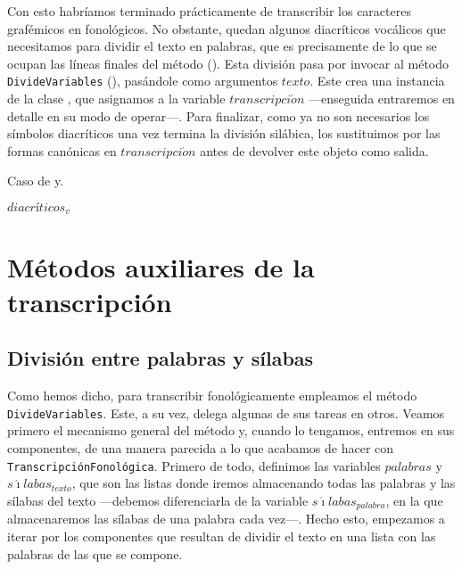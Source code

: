 Con esto habríamos terminado prácticamente de transcribir los caracteres grafémicos en fonológicos. No obstante, quedan algunos diacríticos vocálicos que necesitamos para dividir el texto en palabras, que es precisamente de lo que se ocupan las líneas finales del método (). Esta división pasa por invocar al método \texttt{DivideVariables} (), pasándole como argumentos $texto$. Este crea una instancia de la clase \Valoresp, que asignamos a la variable $transcripci\acute{o}n$ —enseguida entraremos en detalle en su modo de operar—. Para finalizar, como ya no son necesarios los símbolos diacríticos una vez termina la división silábica, los sustituimos por las formas canónicas en $transcripci\acute{o}n$ antes de devolver este objeto como salida.

\begin{algorithm}[!ht] %
	\caption{Caso de \textlangle{}y\textrangle{}.}\label{list:fnlreturn}
	\transcripcion \gets {} \;
	 \gets $diacríticos_{v}$ \;
\end{algorithm}


\section{Métodos auxiliares de la transcripción}
\subsection{División entre palabras y sílabas}
Como hemos dicho, para transcribir fonológicamente empleamos el método \texttt{DivideVariables}. Este, a su vez, delega algunas de sus tareas en otros. Veamos primero el mecanismo general del método y, cuando lo tengamos, entremos en sus componentes, de una manera parecida a lo que acabamos de hacer con \texttt{TranscripciónFonológica}. Primero de todo, definimos las variables $palabras$ y  $s\acute{\imath}labas_{texto}$, que son las listas donde iremos almacenando todas las palabras y las sílabas del texto —debemos diferenciarla de la variable $s\acute{\imath}labas_{palabra}$, en la que almacenaremos las sílabas de una palabra cada vez—. Hecho esto, empezamos a iterar por los componentes que resultan de dividir el texto en una lista con las palabras de las que se compone.

